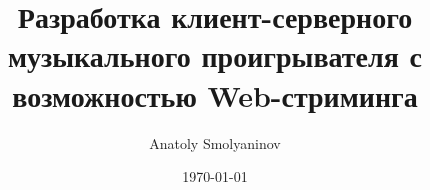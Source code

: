 \documentclass[14pt]{extarticle}
\author{Anatoly Smolyaninov}
\date{\today}
\title{Разработка клиент-серверного музыкального проигрывателя с возможностью Web-стриминга}
\begin{document}
\hypersetup{ hidelinks=true }


\renewcommand*\contentsname{\hfill \large{Содержание} \hfill}
\tableofcontents
\newpage


\newcommand{\anonsection}[1]{
  \paragraph{\centerline{{#1}}}
  \addcontentsline{toc}{section}{#1}
}

\newcommand{\anonsubsection}[1]{
  \paragraph{{#1}}
  \addcontentsline{toc}{subsection}{#1}
}

\newcommand{\append}[1]{
  \stepcounter{section}
  \newpage
  \renewcommand\thesection{\Asbuk{section}}
  \renewcommand\thesubsection{\Asbuk{section}.\arabic{subsection}}
  \paragraph{\centerline{Приложение \Asbuk{section}}}
  \paragraph{\centerline{{#1}}}
  \addcontentsline{toc}{section}{Приложение \Asbuk{section} #1}
}



\newpage


\newpage


\newpage


\newpage


\newpage


\newpage


\newpage
\end{document}
